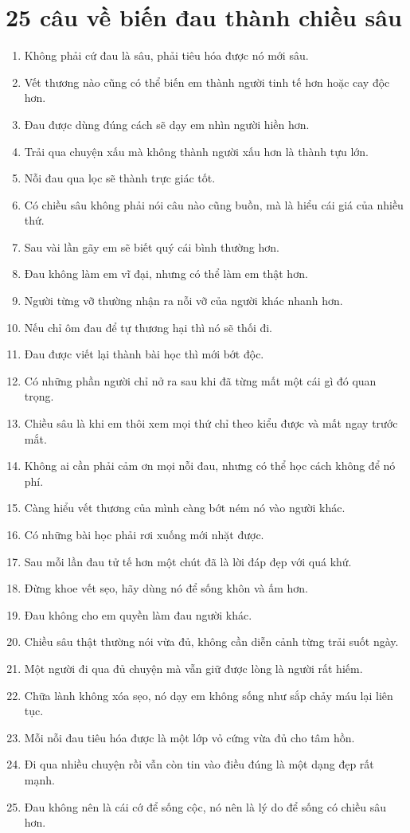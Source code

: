 \section{25 câu về biến đau thành chiều sâu}
\begin{enumerate}[leftmargin=*,resume]
\item Không phải cứ đau là sâu, phải tiêu hóa được nó mới sâu.
\item Vết thương nào cũng có thể biến em thành người tinh tế hơn hoặc cay độc hơn.
\item Đau được dùng đúng cách sẽ dạy em nhìn người hiền hơn.
\item Trải qua chuyện xấu mà không thành người xấu hơn là thành tựu lớn.
\item Nỗi đau qua lọc sẽ thành trực giác tốt.
\item Có chiều sâu không phải nói câu nào cũng buồn, mà là hiểu cái giá của nhiều thứ.
\item Sau vài lần gãy em sẽ biết quý cái bình thường hơn.
\item Đau không làm em vĩ đại, nhưng có thể làm em thật hơn.
\item Người từng vỡ thường nhận ra nỗi vỡ của người khác nhanh hơn.
\item Nếu chỉ ôm đau để tự thương hại thì nó sẽ thối đi.
\item Đau được viết lại thành bài học thì mới bớt độc.
\item Có những phần người chỉ nở ra sau khi đã từng mất một cái gì đó quan trọng.
\item Chiều sâu là khi em thôi xem mọi thứ chỉ theo kiểu được và mất ngay trước mắt.
\item Không ai cần phải cảm ơn mọi nỗi đau, nhưng có thể học cách không để nó phí.
\item Càng hiểu vết thương của mình càng bớt ném nó vào người khác.
\item Có những bài học phải rơi xuống mới nhặt được.
\item Sau mỗi lần đau tử tế hơn một chút đã là lời đáp đẹp với quá khứ.
\item Đừng khoe vết sẹo, hãy dùng nó để sống khôn và ấm hơn.
\item Đau không cho em quyền làm đau người khác.
\item Chiều sâu thật thường nói vừa đủ, không cần diễn cảnh từng trải suốt ngày.
\item Một người đi qua đủ chuyện mà vẫn giữ được lòng là người rất hiếm.
\item Chữa lành không xóa sẹo, nó dạy em không sống như sắp chảy máu lại liên tục.
\item Mỗi nỗi đau tiêu hóa được là một lớp vỏ cứng vừa đủ cho tâm hồn.
\item Đi qua nhiều chuyện rồi vẫn còn tin vào điều đúng là một dạng đẹp rất mạnh.
\item Đau không nên là cái cớ để sống cộc, nó nên là lý do để sống có chiều sâu hơn.
\end{enumerate}

